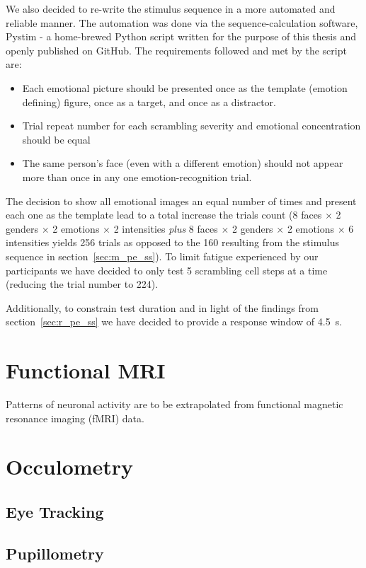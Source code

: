 	    We also decided to re-write the stimulus sequence in a more automated and reliable manner.
	    The automation was done via the sequence-calculation software, Pystim\cite{pystim} - a home-brewed Python script written for the purpose of this thesis and openly published on GitHub.
	    The requirements followed and met by the script are:
	    \begin{itemize}
		\item Each emotional picture should be presented once as the template (emotion defining) figure, once as a target, and once as a distractor.
		\item Trial repeat number for each scrambling severity and emotional concentration should be equal
		\item The same person's face (even with a different emotion) should not appear more than once in any one emotion-recognition trial.
	    \end{itemize}
	    The decision to show all emotional images an equal number of times and present each one as the template lead to a total increase the trials count
	    (8 faces $\times$ 2 genders $\times$ 2 emotions $\times$ 2 intensities \textit{plus} 8 faces $\times$ 2 genders $\times$ 2 emotions $\times$ 6 intensities yields 256 trials as opposed to the 160 resulting from the stimulus sequence in section~\ref{sec:m_pe_ss}).
	    To limit fatigue experienced by our participants we have decided to only test 5 scrambling cell steps at a time (reducing the trial number to 224).
	    
	    Additionally, to constrain test duration and in light of the findings from section~\ref{sec:r_pe_ss} we have decided to provide a response window of \SI{4.5}{\second}.
    \section{Functional MRI}\label{sec:m_fmri}
	Patterns of neuronal activity are to be extrapolated from functional magnetic resonance imaging (fMRI) data.
    \section{Occulometry}\label{sec:m_om}
	\subsection{Eye Tracking}\label{sec:m_om_et}
	\subsection{Pupillometry}\label{sec:m_om_pm}
